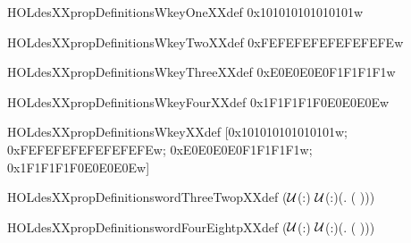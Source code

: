 \newcommand{\HOLdesXXpropDefinitionswFourtransTwoXXdef}{\UseVerbatim{HOLdesXXpropDefinitionswFourtransTwoXXdef}}
\begin{SaveVerbatim}{HOLdesXXpropDefinitionsWkeyOneXXdef}
\HOLTokenTurnstile{}  \HOLSymConst{=} 0x101010101010101w
\end{SaveVerbatim}
\newcommand{\HOLdesXXpropDefinitionsWkeyOneXXdef}{\UseVerbatim{HOLdesXXpropDefinitionsWkeyOneXXdef}}
\begin{SaveVerbatim}{HOLdesXXpropDefinitionsWkeyTwoXXdef}
\HOLTokenTurnstile{}  \HOLSymConst{=} 0xFEFEFEFEFEFEFEFEw
\end{SaveVerbatim}
\newcommand{\HOLdesXXpropDefinitionsWkeyTwoXXdef}{\UseVerbatim{HOLdesXXpropDefinitionsWkeyTwoXXdef}}
\begin{SaveVerbatim}{HOLdesXXpropDefinitionsWkeyThreeXXdef}
\HOLTokenTurnstile{}  \HOLSymConst{=} 0xE0E0E0E0F1F1F1F1w
\end{SaveVerbatim}
\newcommand{\HOLdesXXpropDefinitionsWkeyThreeXXdef}{\UseVerbatim{HOLdesXXpropDefinitionsWkeyThreeXXdef}}
\begin{SaveVerbatim}{HOLdesXXpropDefinitionsWkeyFourXXdef}
\HOLTokenTurnstile{}  \HOLSymConst{=} 0x1F1F1F1F0E0E0E0Ew
\end{SaveVerbatim}
\newcommand{\HOLdesXXpropDefinitionsWkeyFourXXdef}{\UseVerbatim{HOLdesXXpropDefinitionsWkeyFourXXdef}}
\begin{SaveVerbatim}{HOLdesXXpropDefinitionsWkeyXXdef}
\HOLTokenTurnstile{}  \HOLSymConst{=}
   [0x101010101010101w; 0xFEFEFEFEFEFEFEFEw;
    0xE0E0E0E0F1F1F1F1w; 0x1F1F1F1F0E0E0E0Ew]
\end{SaveVerbatim}
\newcommand{\HOLdesXXpropDefinitionsWkeyXXdef}{\UseVerbatim{HOLdesXXpropDefinitionsWkeyXXdef}}
\begin{SaveVerbatim}{HOLdesXXpropDefinitionswordThreeTwopXXdef}
\HOLTokenTurnstile{}  \HOLSymConst{=}
   (\ensuremath{{\cal{U}}}(:)\HOLSymConst{,} \ensuremath{{\cal{U}}}(:)\HOLSymConst{,}(\HOLTokenLambda{}. \HOLSymConst{\&}  \HOLSymConst{/} \HOLSymConst{\&}( \HOLSymConst{\HOLTokenExp{}} )))
\end{SaveVerbatim}
\newcommand{\HOLdesXXpropDefinitionswordThreeTwopXXdef}{\UseVerbatim{HOLdesXXpropDefinitionswordThreeTwopXXdef}}
\begin{SaveVerbatim}{HOLdesXXpropDefinitionswordFourEightpXXdef}
\HOLTokenTurnstile{}  \HOLSymConst{=}
   (\ensuremath{{\cal{U}}}(:)\HOLSymConst{,} \ensuremath{{\cal{U}}}(:)\HOLSymConst{,}(\HOLTokenLambda{}. \HOLSymConst{\&}  \HOLSymConst{/} \HOLSymConst{\&}( \HOLSymConst{\HOLTokenExp{}} )))
\end{SaveVerbatim}
